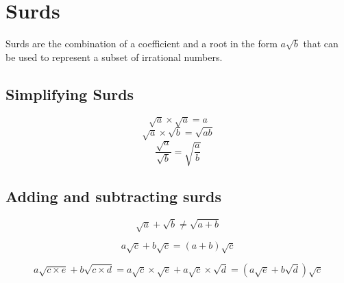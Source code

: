 \documentclass{article}
\begin{document}
\section{Surds}
Surds are the combination of a coefficient and a root in the form $a\sqrt{b}$ that can be used to 
represent a subset of irrational numbers.

\subsection{Simplifying Surds}

\begin{equation}
	\label{simple_equation}
	\sqrt{a} \times \sqrt{a} = a
\end{equation}
\begin{equation}
	\label{simple_equation}
	\sqrt{a} \times \sqrt{b} = \sqrt{ab}
\end{equation}
\begin{equation}
	\label{simple_equation}
	\frac{\sqrt{a}}{\sqrt{b}} = \sqrt{\frac{a}{b}}
\end{equation}

\subsection{Adding and subtracting surds}

\begin{equation}
	\label{bad_add}
	\sqrt{a} + \sqrt{b} \ne \sqrt{a + b}
\end{equation}

\begin{equation}
	\label{simple_surd_add}
	a\sqrt{c} + b\sqrt{c} = (a + b)\sqrt{c}
\end{equation}

\begin{equation}
	\label{surd_add}
	a\sqrt{c \times e} + b\sqrt{c \times d} = a\sqrt{c} \times \sqrt{e} + a\sqrt{c} \times \sqrt{d}
	 = (a\sqrt{e} + b\sqrt{d})\sqrt{c}
\end{equation}
\end{document}
